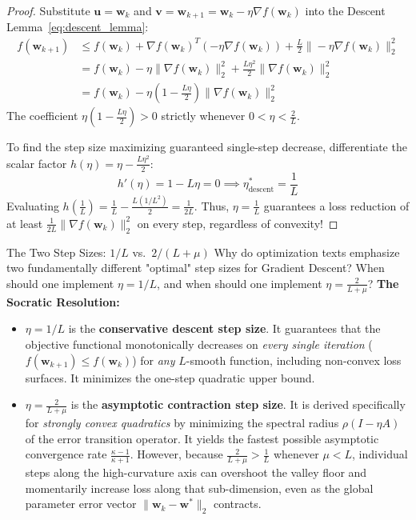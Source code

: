 \begin{proof}
Substitute $\mathbf{u} = \mathbf{w}_k$ and $\mathbf{v} = \mathbf{w}_{k+1} = \mathbf{w}_k - \eta \nabla f(\mathbf{w}_k)$ into the Descent Lemma~\eqref{eq:descent_lemma}:
\begin{align}
f(\mathbf{w}_{k+1}) &\le f(\mathbf{w}_k) + \nabla f(\mathbf{w}_k)^T (-\eta \nabla f(\mathbf{w}_k)) + \frac{L}{2} \|-\eta \nabla f(\mathbf{w}_k)\|_2^2 \nonumber \\
&= f(\mathbf{w}_k) - \eta \|\nabla f(\mathbf{w}_k)\|_2^2 + \frac{L\eta^2}{2} \|\nabla f(\mathbf{w}_k)\|_2^2 \nonumber \\
&= f(\mathbf{w}_k) - \eta \left( 1 - \frac{L\eta}{2} \right) \|\nabla f(\mathbf{w}_k)\|_2^2
\end{align}
The coefficient $\eta\left(1 - \frac{L\eta}{2}\right) > 0$ strictly whenever $0 < \eta < \frac{2}{L}$. 

To find the step size maximizing guaranteed single-step decrease, differentiate the scalar factor $h(\eta) = \eta - \frac{L\eta^2}{2}$:
\begin{equation}
h'(\eta) = 1 - L\eta = 0 \implies \eta^*_{\text{descent}} = \frac{1}{L}
\end{equation}
Evaluating $h\left(\frac{1}{L}\right) = \frac{1}{L} - \frac{L(1/L^2)}{2} = \frac{1}{2L}$. Thus, $\eta = \frac{1}{L}$ guarantees a loss reduction of at least $\frac{1}{2L}\|\nabla f(\mathbf{w}_k)\|_2^2$ on every step, regardless of convexity!
\end{proof}

\begin{ponderbox}{The Two Step Sizes: $1/L$ vs.\ $2/(L+\mu)$}
Why do optimization texts emphasize two fundamentally different "optimal" step sizes for Gradient Descent? When should one implement $\eta = 1/L$, and when should one implement $\eta = \frac{2}{L+\mu}$?
\tcblower
\textbf{The Socratic Resolution:}
\begin{itemize}
    \item $\eta = 1/L$ is the \textbf{conservative descent step size}. It guarantees that the objective functional monotonically decreases on \emph{every single iteration} ($f(\mathbf{w}_{k+1}) \le f(\mathbf{w}_k)$) for \emph{any} $L$-smooth function, including non-convex loss surfaces. It minimizes the one-step quadratic upper bound.
    \item $\eta = \frac{2}{L+\mu}$ is the \textbf{asymptotic contraction step size}. It is derived specifically for \emph{strongly convex quadratics} by minimizing the spectral radius $\rho(I - \eta A)$ of the error transition operator. It yields the fastest possible asymptotic convergence rate $\frac{\kappa-1}{\kappa+1}$. However, because $\frac{2}{L+\mu} > \frac{1}{L}$ whenever $\mu < L$, individual steps along the high-curvature axis can overshoot the valley floor and momentarily increase loss along that sub-dimension, even as the global parameter error vector $\|\mathbf{w}_k - \mathbf{w}^*\|_2$ contracts.
\end{itemize}
\end{ponderbox}

